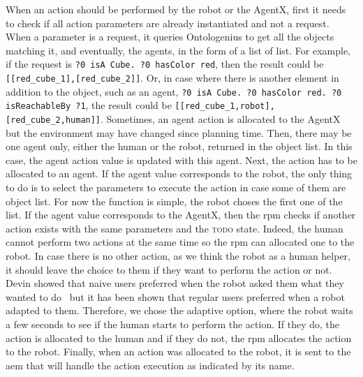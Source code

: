 \documentclass[a4paper,11pt,twoside]{StyleThese}
\begin{document}
When an action should be performed by the robot or the AgentX, first it needs to check if all action parameters are already instantiated and not a \sparql{} request. When a parameter is a \sparql{} request, it queries Ontologenius to get all the objects matching it, and eventually, the agents, in the form of a list of list. For example, if the \sparql{} request is \verb'?0 isA Cube. ?0 hasColor red', then the result could be \verb'[[red_cube_1],[red_cube_2]]'. Or, in case where there is another element in addition to the object, such as an agent, \eg \verb'?0 isA Cube. ?0 hasColor red. ?0 isReachableBy ?1', the result could be \verb'[[red_cube_1,robot],[red_cube_2,human]]'. Sometimes, an agent action is allocated to the AgentX but the environment may have changed since planning time. Then, there may be one agent only, either the human or the robot, returned in the object list. In this case, the agent action value is updated with this agent. Next, the action has to be allocated to an agent. If the agent value corresponds to the robot, the only thing to do is to select the parameters to execute the action in case some of them are object list. For now the function is simple, the robot choses the first one of the list. If the agent value corresponds to the AgentX, then the \acrshort{rpm} checks if another action exists with the same parameters and the \textsc{todo} state. Indeed, the human cannot perform two actions at the same time so the \acrshort{rpm} can allocated one to the robot. In case there is no other action, as we think the robot as a human helper, it should leave the choice to them if they want to perform the action or not. Devin showed that naive users preferred when the robot asked them what they wanted to do~\cite{devin_2017_decisions} but it has been shown that regular users preferred when a robot adapted to them. Therefore, we chose the adaptive option, where the robot waits a few seconds to see if the human starts to perform the action. If they do, the action is allocated to the human and if they do not, the \acrshort{rpm} allocates the action to the robot. Finally, when an action was allocated to the robot, it is sent to the \acrlong{aem} that will handle the action execution as indicated by its name.
\end{document}
